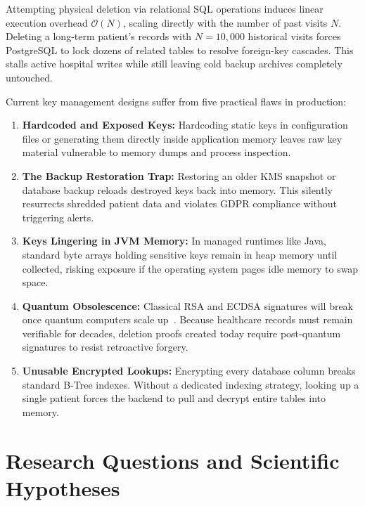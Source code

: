 Attempting physical deletion via relational SQL operations induces linear execution overhead $\mathcal{O}(N)$, scaling directly with the number of past visits $N$. Deleting a long-term patient's records with $N = 10{,}000$ historical visits forces PostgreSQL to lock dozens of related tables to resolve foreign-key cascades. This stalls active hospital writes while still leaving cold backup archives completely untouched.

Current key management designs suffer from five practical flaws in production:
\begin{enumerate}
    \item \textbf{Hardcoded and Exposed Keys:} Hardcoding static keys in configuration files or generating them directly inside application memory leaves raw key material vulnerable to memory dumps and process inspection.
    \item \textbf{The Backup Restoration Trap:} Restoring an older KMS snapshot or database backup reloads destroyed keys back into memory. This silently resurrects shredded patient data and violates GDPR compliance without triggering alerts.
    \item \textbf{Keys Lingering in JVM Memory:} In managed runtimes like Java, standard byte arrays holding sensitive keys remain in heap memory until collected, risking exposure if the operating system pages idle memory to swap space.
    \item \textbf{Quantum Obsolescence:} Classical RSA and ECDSA signatures will break once quantum computers scale up~\cite{nist_fips_204}. Because healthcare records must remain verifiable for decades, deletion proofs created today require post-quantum signatures to resist retroactive forgery.
    \item \textbf{Unusable Encrypted Lookups:} Encrypting every database column breaks standard B-Tree indexes. Without a dedicated indexing strategy, looking up a single patient forces the backend to pull and decrypt entire tables into memory.
\end{enumerate}


\section{Research Questions and Scientific Hypotheses}\label{section:research-questions}

